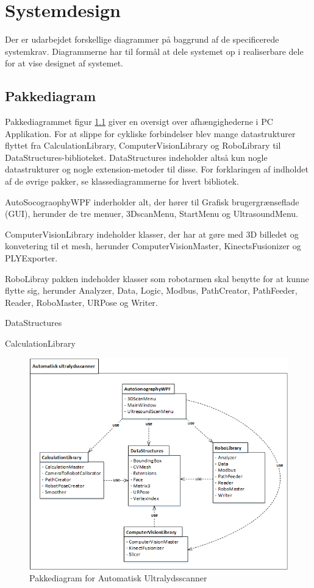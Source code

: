 \chapter{Systemdesign}\label{Systemdesign}
Der er udarbejdet forskellige diagrammer på baggrund af de specificerede systemkrav.  Diagrammerne har til formål at dele systemet op i realiserbare dele for at vise designet af systemet. 

\section{Pakkediagram}
Pakkediagrammet figur \ref{Pakkediagram} giver en oversigt over afhængighederne i PC Applikation.
For at slippe for cykliske forbindelser blev mange datastrukturer flyttet fra CalculationLibrary, ComputerVisionLibrary og RoboLibrary til DataStructures-biblioteket.
DataStructures indeholder altså kun nogle datastrukturer og nogle extension-metoder til disse. 
For forklaringen af indholdet af de øvrige pakker, se klassediagrammerne for hvert bibliotek.

AutoSocograophyWPF inderholder alt, der hører til Grafisk brugergrænseflade (GUI), herunder de tre menuer, 3DscanMenu, StartMenu og UltrasoundMenu. 

ComputerVisionLibrary indeholder klasser, der har at gøre med 3D billedet og konvetering til et mesh, herunder ComputerVisionMaster, KinectsFusionizer og PLYExporter. 

RoboLibray pakken indeholder klasser som robotarmen skal benytte for at kunne flytte sig, herunder Analyzer, Data, Logic, Modbus, PathCreator, PathFeeder, Reader, RoboMaster, URPose og Writer. 

DataStructures

CalculationLibrary

\begin{figure}[H]
    \centering
    \includegraphics[width=1\textwidth]{figurer/d/Design/Pakkediagram}
    \caption{Pakkediagram for Automatisk Ultralydsscanner}
    \label{Pakkediagram}
\end{figure}
\newpage

